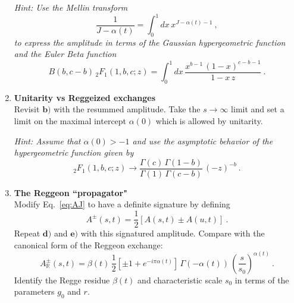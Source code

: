 \begin{enumerate}
          \noindent \textit{Hint: Use the Mellin transform
              \begin{equation}
                  \frac{1}{J-\alpha(t)} = \int_0^1 dx \, x^{J-\alpha(t) - 1} ~,
              \end{equation}
              to express the amplitude in terms of the Gaussian hypergeometric function and the Euler Beta function
              \begin{equation}
                  B(b, c-b) \, _2F_1(1, b, c; z) =  \int_0^1 dx \, \frac{ x^{b-1} \, (1-x)^{c-b-1}}{1-x \, z} ~.
              \end{equation}
          }
    \item \textbf{Unitarity vs Reggeized exchanges} \\
          Revisit $\mathbf{b)}$ with the resummed amplitude. Take the $s\to\infty$ limit and set a limit on the maximal intercept $\alpha(0)$ which is allowed by unitarity.

          \noindent \textit{Hint: Assume that $\alpha(0) > -1$ and use the asymptotic behavior of the hypergeometric function given by
              \begin{equation}
                  _2F_1(1,b,c;z) \to \frac{\Gamma(c)\,\Gamma(1-b)}{\Gamma(1) \,\Gamma(c-b)} \, (-z)^{-b}  ~.
              \end{equation}
          }

    \item \textbf{The Reggeon ``propagator"} \\
          Modify Eq.~\ref{eq:AJ} to have a definite signature by defining
          \begin{equation}
              A^{\pm}(s,t) = \frac{1}{2}\left[A(s,t) \pm A(u,t) \right]~.
          \end{equation}
          Repeat $\textbf{d)}$ and  $\textbf{e)}$ with this signatured amplitude. Compare with the canonical form of the Reggeon exchange:
          \begin{equation}
              A^\pm_\mathbb{R}(s,t) = \beta(t) \, \frac{1}{2}\left[\pm1 + e^{-i\pi\alpha(t)}\right] \, \Gamma(-\alpha(t)) \, \left(\frac{s}{s_0}\right)^{\alpha(t)} ~.
          \end{equation}
          Identify the Regge residue $\beta(t)$ and characteristic scale $s_0$ in terms of the parameters $g_0$ and $r$.

\end{enumerate}